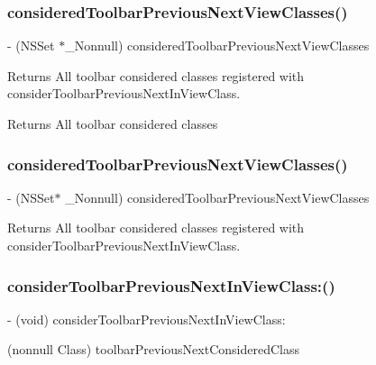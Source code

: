 \subsubsection{\texorpdfstring{considered\+Toolbar\+Previous\+Next\+View\+Classes()}{consideredToolbarPreviousNextViewClasses()}\hspace{0.1cm}{\footnotesize\ttfamily [2/3]}}
{\footnotesize\ttfamily -\/ (N\+S\+Set $\ast$\+\_\+\+Nonnull) considered\+Toolbar\+Previous\+Next\+View\+Classes \begin{DoxyParamCaption}{ }\end{DoxyParamCaption}}

Returns All toolbar considered classes registered with consider\+Toolbar\+Previous\+Next\+In\+View\+Class.

Returns All toolbar considered classes \mbox{\label{interface_i_q_keyboard_manager_a53372abfa157904c7e17dd8b5b544b09}} 
\subsubsection{\texorpdfstring{considered\+Toolbar\+Previous\+Next\+View\+Classes()}{consideredToolbarPreviousNextViewClasses()}\hspace{0.1cm}{\footnotesize\ttfamily [3/3]}}
{\footnotesize\ttfamily -\/ (N\+S\+Set$\ast$ \+\_\+\+Nonnull) considered\+Toolbar\+Previous\+Next\+View\+Classes \begin{DoxyParamCaption}{ }\end{DoxyParamCaption}}

Returns All toolbar considered classes registered with consider\+Toolbar\+Previous\+Next\+In\+View\+Class. \mbox{\label{interface_i_q_keyboard_manager_a2d970d5680770d6aaced62a822b31958}} 
\subsubsection{\texorpdfstring{consider\+Toolbar\+Previous\+Next\+In\+View\+Class\+:()}{considerToolbarPreviousNextInViewClass:()}\hspace{0.1cm}{\footnotesize\ttfamily [1/3]}}
{\footnotesize\ttfamily -\/ (void) consider\+Toolbar\+Previous\+Next\+In\+View\+Class\+: \begin{DoxyParamCaption}\item[{(nonnull Class)}]{toolbar\+Previous\+Next\+Considered\+Class }\end{DoxyParamCaption}}

